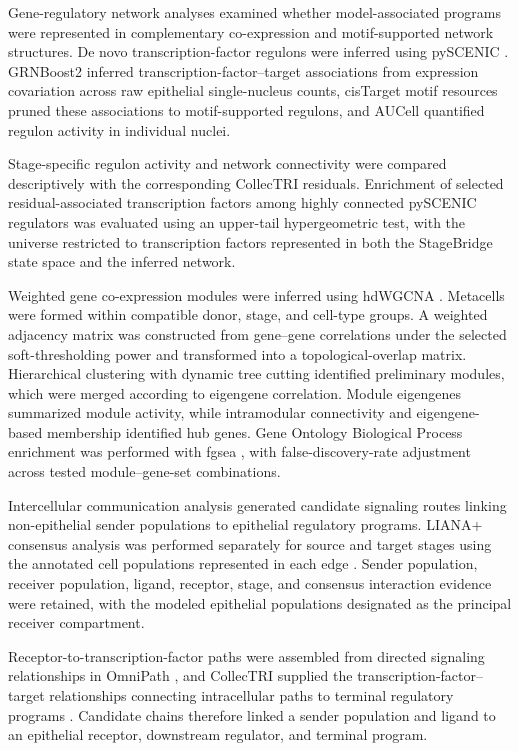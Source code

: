 Gene-regulatory network analyses examined whether model-associated programs were represented in complementary co-expression and motif-supported network
structures. De novo transcription-factor regulons were inferred using pySCENIC
\autocite{Aibar2017-kq}. GRNBoost2 inferred transcription-factor--target associations from expression covariation across raw epithelial single-nucleus counts, cisTarget motif resources pruned these associations to motif-supported regulons, and AUCell quantified regulon activity in individual nuclei.

Stage-specific regulon activity and network connectivity were compared
descriptively with the corresponding CollecTRI residuals. Enrichment of selected residual-associated transcription factors among highly connected pySCENIC regulators was evaluated using an upper-tail hypergeometric test, with the universe restricted to transcription factors represented in both the StageBridge state space and the inferred network.

Weighted gene co-expression modules were inferred using hdWGCNA
\autocite{Morabito2023-yq}. Metacells were formed within compatible donor,
stage, and cell-type groups. A weighted adjacency matrix was constructed from
gene--gene correlations under the selected soft-thresholding power and
transformed into a topological-overlap matrix. Hierarchical clustering with dynamic tree cutting identified preliminary modules, which were merged according to eigengene correlation. Module eigengenes summarized module
activity, while intramodular connectivity and eigengene-based membership identified hub genes. Gene Ontology Biological Process enrichment was performed
with fgsea \autocite{Korotkevich2016-ou}, with false-discovery-rate adjustment
across tested module--gene-set combinations.

Intercellular communication analysis generated candidate signaling routes linking non-epithelial sender populations to epithelial regulatory programs.
LIANA+ consensus analysis was performed separately for source and target stages
using the annotated cell populations represented in each edge
\autocite{Dimitrov2024-fb}. Sender population, receiver population, ligand,
receptor, stage, and consensus interaction evidence were retained, with the
modeled epithelial populations designated as the principal receiver
compartment.

Receptor-to-transcription-factor paths were assembled from directed signaling
relationships in OmniPath \autocite{Turei2026-bn}, and CollecTRI supplied the
transcription-factor--target relationships connecting intracellular paths to
terminal regulatory programs \autocite{Muller-Dott2023-mu}. Candidate chains
therefore linked a sender population and ligand to an epithelial receptor,
downstream regulator, and terminal program.

